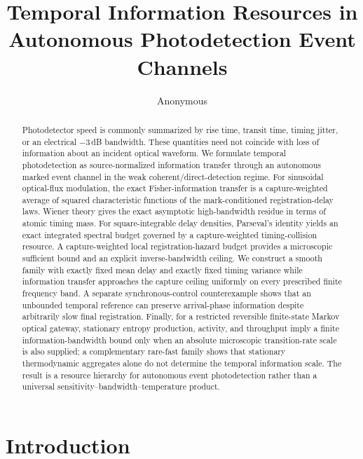 \documentclass[aps,prapplied,preprint,nofootinbib]{revtex4-2}
\begin{document}
\title{Temporal Information Resources in Autonomous Photodetection Event Channels}
\author{Anonymous}

\begin{abstract}
Photodetector speed is commonly summarized by rise time, transit time, timing jitter, or an electrical $-3\,$dB bandwidth. These quantities need not coincide with loss of information about an incident optical waveform. We formulate temporal photodetection as source-normalized information transfer through an autonomous marked event channel in the weak coherent/direct-detection regime. For sinusoidal optical-flux modulation, the exact Fisher-information transfer is a capture-weighted average of squared characteristic functions of the mark-conditioned registration-delay laws. Wiener theory gives the exact asymptotic high-bandwidth residue in terms of atomic timing mass. For square-integrable delay densities, Parseval's identity yields an exact integrated spectral budget governed by a capture-weighted timing-collision resource. A capture-weighted local registration-hazard budget provides a microscopic sufficient bound and an explicit inverse-bandwidth ceiling. We construct a smooth family with exactly fixed mean delay and exactly fixed timing variance while information transfer approaches the capture ceiling uniformly on every prescribed finite frequency band. A separate synchronous-control counterexample shows that an unbounded temporal reference can preserve arrival-phase information despite arbitrarily slow final registration. Finally, for a restricted reversible finite-state Markov optical gateway, stationary entropy production, activity, and throughput imply a finite information-bandwidth bound only when an absolute microscopic transition-rate scale is also supplied; a complementary rare-fast family shows that stationary thermodynamic aggregates alone do not determine the temporal information scale. The result is a resource hierarchy for autonomous event photodetection rather than a universal sensitivity--bandwidth--temperature product.
\end{abstract}

\maketitle

\section{Introduction}
\end{document}
